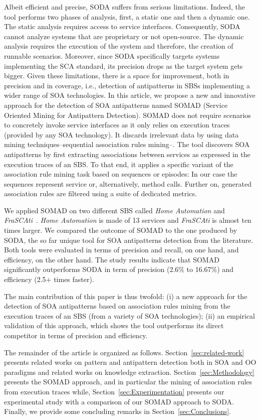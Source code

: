 Albeit efficient and precise, SODA suffers from serious limitations. Indeed, the tool performs two phases of analysis, first, a static one and then a dynamic one. The static analysis requires access to service interfaces. Consequently, SODA cannot analyze systems that are proprietary or not open-source. The dynamic analysis requires the execution of the system and therefore, the creation of runnable scenarios. Moreover, since SODA 
specifically targets systems implementing the SCA standard, its precision drops as the target system gets bigger. 
%
Given these limitations, there is a space for improvement, both in precision and in coverage, i.e., detection of antipatterns in SBSs implementing a wider range of SOA technologies.
%
In this article, we propose a new and innovative approach for the detection of SOA antipatterns named SOMAD (Service Oriented Mining for Antipattern Detection). SOMAD does not require scenarios to concretely invoke service interfaces as it only relies on execution traces (provided by any SOA technology). It discards irrelevant data by using data mining techniques--sequential association rules mining--. The tool discovers SOA antipatterns by first extracting associations between services as expressed in the execution traces of an SBS. To that end, it applies a specific variant of the association rule mining task based on sequences or episodes: In our case the sequences represent service or, alternatively, method calls. Further on, generated association rules are filtered using a suite of dedicated metrics.

We applied SOMAD on two different SBS called \emph{Home Automation} and \emph{FraSCAti}~\cite{SPE:SPE1077}. \emph{Home Automation} is made of 13 services and \emph{FraSCAti} is almost ten times larger. We compared the outcome of SOMAD to the one produced by SODA, the so far unique tool for SOA antipatterns detection from the literature. Both tools were evaluated in terms of precision and recall, on one hand, and efficiency, on the other hand.  The study results indicate that SOMAD significantly outperforms SODA in term of precision (2.6\% to 16.67\%) and efficiency (2.5+ times faster).

The main contribution of this paper is thus twofold: (i) a new approach for the detection of SOA antipatterns based on association rules mining from the execution traces of an SBS (from a variety of SOA technologies); (ii) an empirical validation of this approach, which shows the tool outperforms its direct competitor in terms of precision and efficiency. 

The remainder of the article is organized as follows. Section~\ref{sec:related-work} presents related works on pattern and antipattern detection both in SOA and OO paradigms and related works on knowledge extraction. Section~\ref{sec:Methodology}
presents the SOMAD approach, and in particular the mining of association rules from execution traces while, Section~\ref{sec:Experimentation} presents our experimental study with a comparison of our SOMAD approach to SODA. Finally, we provide some concluding remarks in Section~\ref{sec:Conclusions}.
